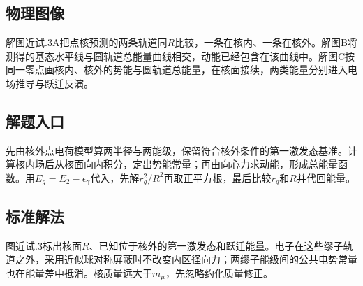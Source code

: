 \documentclass[UTF8,fontset=fandol,a4paper,11pt]{ctexart}
\begin{document}


\subsection*{物理图像}

解图近试.3A把点核预测的两条轨道同$R$比较，一条在核内、一条在核外。解图B将测得的基态水平线与圆轨道总能量曲线相交，动能已经包含在该曲线中。解图C按同一零点画核内、核外的势能与圆轨道总能量，在核面接续，两类能量分别进入电场推导与跃迁反演。



\subsection*{解题入口}

先由核外点电荷模型算两半径与两能级，保留符合核外条件的第一激发态基准。计算核内场后从核面向内积分，定出势能常量；再由向心力求动能，形成总能量函数。用$E_g=E_2-\epsilon_\gamma$代入，先解$r_g^2/R^2$再取正平方根，最后比较$r_g$和$R$并代回能量。



\subsection*{标准解法}


图近试.3标出核面$R$、已知位于核外的第一激发态和跃迁能量。电子在这些缪子轨道之外，采用近似球对称屏蔽时不改变内区径向力；两缪子能级间的公共电势常量也在能量差中抵消。核质量远大于$m_\mu$，先忽略约化质量修正。
\end{document}
